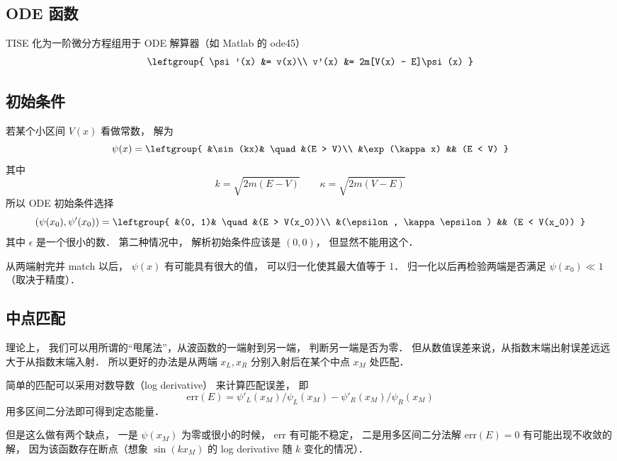 
\subsection{ODE 函数}
TISE 化为一阶微分方程组用于 ODE 解算器（如 Matlab 的 ode45）
\begin{equation}
\leftgroup{
\psi'(x) &= v(x)\\
v'(x) &= 2m[V(x) - E]\psi(x)
}\end{equation}

\subsection{初始条件}
若某个小区间 $V(x)$ 看做常数， 解为
\begin{equation}
\psi(x) = \leftgroup{
&\sin(kx)& \quad &(E > V)\\
&\exp(\kappa x) && (E < V)
}\end{equation}
其中
\begin{equation}
k = \sqrt{2m(E - V)} \qquad
\kappa = \sqrt{2m(V - E)}
\end{equation}
所以 ODE  初始条件选择
\begin{equation}
(\psi(x_0), \psi'(x_0)) = \leftgroup{
&(0, 1)& \quad &(E > V(x_0))\\
&(\epsilon, \kappa\epsilon) && (E < V(x_0))
}\end{equation}
其中 $\epsilon$ 是一个很小的数． 第二种情况中， 解析初始条件应该是 $(0, 0)$， 但显然不能用这个．

从两端射完并 match 以后， $\psi(x)$ 有可能具有很大的值， 可以归一化使其最大值等于 1． 归一化以后再检验两端是否满足 $\psi(x_0) \ll 1$（取决于精度）．

\subsection{中点匹配}
理论上， 我们可以用所谓的“甩尾法”，从波函数的一端射到另一端， 判断另一端是否为零． 但从数值误差来说，从指数末端出射误差远远大于从指数末端入射． 所以更好的办法是从两端 $x_L, x_R$ 分别入射后在某个中点 $x_M$ 处匹配．

简单的匹配可以采用对数导数（log derivative） 来计算匹配误差， 即
\begin{equation}
\text{err}(E) = \psi'_L(x_M)/\psi_L(x_M) - \psi'_R(x_M)/\psi_R(x_M)
\end{equation}
用多区间二分法即可得到定态能量．

但是这么做有两个缺点， 一是 $\psi(x_M)$ 为零或很小的时候， err 有可能不稳定， 二是用多区间二分法解 $\text{err}(E) = 0$ 有可能出现不收敛的解， 因为该函数存在断点（想象 $\sin(k x_M)$ 的 log derivative 随 $k$ 变化的情况）．

